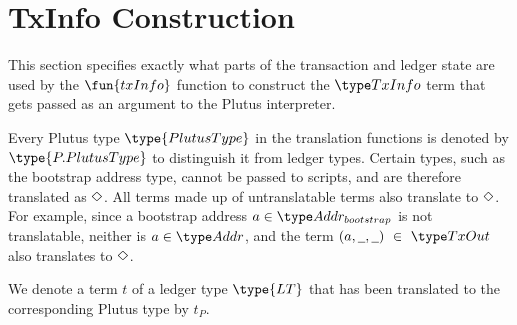 \section{TxInfo Construction}
\label{sec:txinfo}

This section specifies exactly what parts of the transaction and ledger
state are used by the $\fun{txInfo}$ function to construct the
$\TxInfo$ term that gets passed as an
argument to the Plutus interpreter.

Every Plutus type $\type{PlutusType}$ in the translation functions is denoted
by $\type{P.PlutusType}$ to distinguish it from ledger types. Certain
types, such as the bootstrap address type, cannot be passed to scripts, and
are therefore translated as $\Diamond$. All terms made up of untranslatable
terms also translate to $\Diamond$. For example, since a bootstrap address $a \in \AddrBS$
is not translatable, neither is $a\in\Addr$, and the term $(a,\wcard,\wcard)~\in~\TxOut$
also translates to $\Diamond$.

We denote a term $t$ of a ledger type $\type{LT}$ that has been translated to the
corresponding Plutus type by $t_P$.

